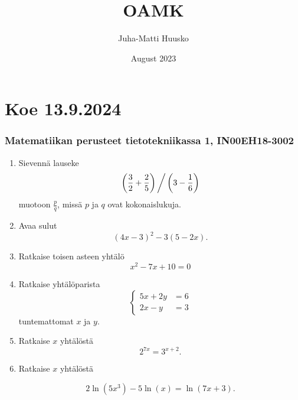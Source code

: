\documentclass[12pt]{article}
\title{OAMK}
\author{Juha-Matti Huusko}
\date{August 2023}
\renewcommand{\ratkaisu}[1]{{\color{blue}\quad\textrm{Ratkaisu: } #1}}
\renewcommand{\ratkaisu}[1]{}
\begin{document}
\thispagestyle{empty}

\section*{Koe 13.9.2024}
\subsubsection*{Matematiikan perusteet tietotekniikassa 1, IN00EH18-3002}

\begin{enumerate}
\item Sievennä lauseke
    $$\left(\frac32+\frac25\right)\bigg/\left(3-\frac16\right)$$\ratkaisu{1/2} %
muotoon $\frac{p}{q}$, missä $p$ ja $q$ ovat kokonaislukuja.

\item Avaa sulut
$$(4x-3)^2-3(5-2x).$$\ratkaisu{$16x^2$} %


\item Ratkaise toisen asteen yhtälö
$$x^2-7x+10=0$$\ratkaisu{$x=-1,x=2$} %

\item Ratkaise yhtälöparista
$$\begin{cases}
5x+2y&=6\\
2x-y&=3
\end{cases}\ratkaisu{$x=2/3, y=-1/3$}
$$
tuntemattomat $x$ ja $y$.

\def\a{2}\def\b{7}\def\c{3}\def\d{2} %


\item Ratkaise $x$ yhtälöstä
$$
\a^{\b x}=\c^{x+\d}.
$$
\ratkaisu{$x=\frac{\d \ln(\c)}{\b \ln(\a)-\ln(\c)}$}

\item Ratkaise $x$ yhtälöstä

$$2\ln(5x^3)-5\ln(x)=\ln(7x+3).$$\ratkaisu{$x=1/6$} %


\end{enumerate}
\end{document}
